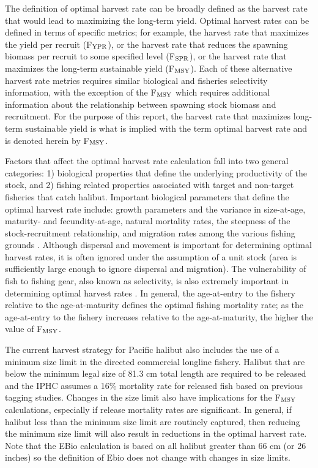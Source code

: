 The definition of optimal harvest rate can be broadly defined as the harvest rate that would lead to maximizing the long-term yield.  Optimal harvest rates can be defined in terms of specific metrics; for example, the harvest rate that maximizes the yield per recruit (F$_{\rm{YPR}}$), or the harvest rate that reduces the spawning biomass per recruit to some specified level (F$_{\rm{SPR}}$), or the harvest rate that maximizes the long-term sustainable yield (F$_{\rm{MSY}}$).  Each of these alternative harvest rate metrics requires similar biological and fisheries selectivity information, with the exception of the F$_{\rm{MSY}}$ which requires additional information about the relationship between spawning stock biomass and recruitment. For the purpose of this report, the harvest rate that maximizes long-term sustainable yield is what is implied with the term optimal harvest rate and is denoted herein by F$_{\rm{MSY}}$.

Factors that affect the optimal harvest rate calculation fall into two general categories: 1) biological properties that define the underlying productivity of the stock, and 2) fishing related properties associated with target and non-target fisheries that catch halibut.  Important biological parameters that define the optimal harvest rate include: growth parameters and the variance in size-at-age, maturity- and fecundity-at-age, natural mortality rates, the steepness of the stock-recruitment relationship,  and migration rates among the various fishing grounds \citep{Beddington2005}. Although  dispersal and movement is important for determining optimal harvest rates, it is often ignored under the assumption of a unit stock (area is sufficiently large enough to ignore dispersal and migration). The vulnerability of fish to fishing gear, also known as selectivity, is also extremely important in determining optimal harvest rates \citep{hilborn1992quantitative}.  In general, the age-at-entry to the fishery relative to the age-at-maturity defines the optimal fishing mortality rate; as the age-at-entry to the fishery increases relative to the age-at-maturity, the higher the value of F$_{\rm{MSY}}$.


The current harvest strategy for Pacific halibut also includes the use of a minimum size limit in the directed commercial longline fishery. Halibut that are below the minimum legal size of 81.3 cm total length are required to be released and the IPHC assumes a 16\% mortality rate for released fish based on previous tagging studies.  Changes in the size limit also have implications for the F$_{\rm{MSY}}$ calculations, especially if release mortality rates are significant. In general, if halibut less than the minimum size limit are routinely captured, then reducing the minimum size limit will also result in reductions in the optimal harvest rate.  Note that the EBio calculation is based on all halibut greater than 66 cm (or 26 inches) so the definition of Ebio does not change with changes in size limits. 

